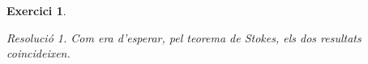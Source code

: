 \documentclass[10pt,a4paper]{article}
\newtheorem{exercice}{Exercici}
\theoremstyle{remark}
\newtheorem*{resolution}{Resolució}
\theoremstyle{math}
\begin{document}
\begin{exercice}
\begin{resolution}
    Com era d'esperar, pel teorema de Stokes, els dos resultats coincideixen.
  \end{resolution}
\end{exercice}
\end{document}
